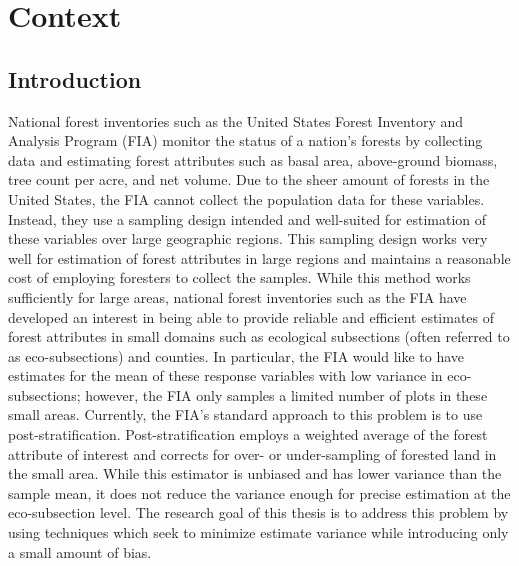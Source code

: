 \documentclass[12pt,twoside]{reedthesis}
\begin{document}
\hypertarget{context}{%
\chapter{Context}\label{context}}

\hypertarget{introduction}{%
\section{Introduction}\label{introduction}}

National forest inventories such as the United States Forest Inventory and Analysis Program (FIA) monitor the status of a nation's forests by collecting data and estimating forest attributes such as basal area, above-ground biomass, tree count per acre, and net volume. Due to the sheer amount of forests in the United States, the FIA cannot collect the population data for these variables. Instead, they use a sampling design intended and well-suited for estimation of these variables over large geographic regions. This sampling design works very well for estimation of forest attributes in large regions and maintains a reasonable cost of employing foresters to collect the samples. While this method works sufficiently for large areas, national forest inventories such as the FIA have developed an interest in being able to provide reliable and efficient estimates of forest attributes in small domains such as ecological subsections (often referred to as eco-subsections) and counties. In particular, the FIA would like to have estimates for the mean of these response variables with low variance in eco-subsections; however, the FIA only samples a limited number of plots in these small areas. Currently, the FIA's standard approach to this problem is to use post-stratification. Post-stratification employs a weighted average of the forest attribute of interest and corrects for over- or under-sampling of forested land in the small area. While this estimator is unbiased and has lower variance than the sample mean, it does not reduce the variance enough for precise estimation at the eco-subsection level. The research goal of this thesis is to address this problem by using techniques which seek to minimize estimate variance while introducing only a small amount of bias.
\end{document}
